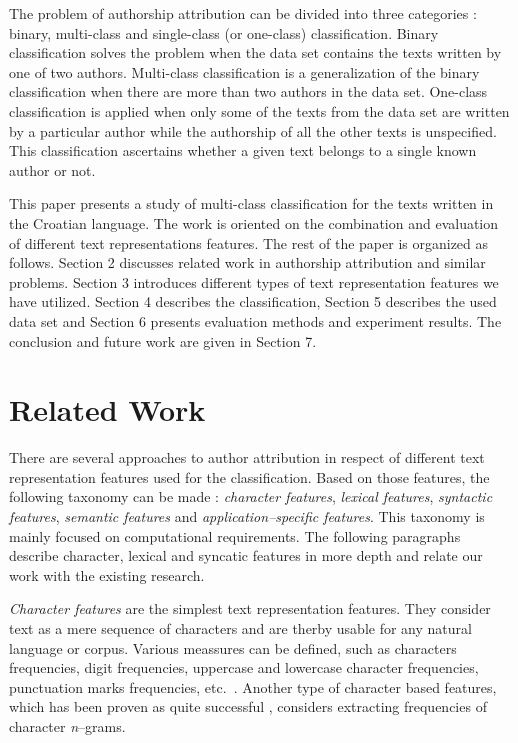 \documentclass{llncs}
\begin{document}
The problem of authorship attribution can be divided into three categories
\cite{zhao2005effective}: binary, multi-class and single-class (or one-class)
classification. Binary classification solves the problem when the data set
contains the texts written by one of two authors. Multi-class classification is a
generalization of the binary classification when there are more than two authors
in the data set. One-class classification is applied when only some of the texts
from the data set are written by a particular author while the authorship of all
the other texts is unspecified. This classification ascertains whether a given
text belongs to a single known author or not.

This paper presents a study of multi-class classification for the texts written
in the Croatian language. The work is oriented on the combination and evaluation
of different text representations features. The rest of the paper is organized as
follows. Section 2 discusses related work in authorship attribution and similar
problems. Section 3 introduces different types of text representation features we
have utilized. Section 4 describes the classification, Section 5 describes the
used data set and Section 6 presents evaluation methods and experiment results.
The conclusion and future work are given in Section 7.

\section{Related Work}
There are several approaches to author attribution in respect of different text
representation features used for the classification. Based on those features, the
following taxonomy can be made \cite{stamatatos2009survey}: \emph{character features},
\emph{lexical features}, \emph{syntactic features}, \emph{semantic features} and
\emph{application--specific features}.  This taxonomy is mainly focused on computational requirements. 
The following paragraphs describe character, lexical and syncatic features 
in more depth and relate our work with the existing research.

\emph{Character features} are the simplest text representation features. They
consider text as a mere sequence of characters and are therby usable for any natural
language or corpus. Various meassures can be defined, such as
characters frequencies, digit frequencies, uppercase and lowercase character
frequencies, punctuation marks frequencies, etc.\ \cite{de2001mining}. Another
type of character based features, which has been proven as quite successful
\cite{peng2003language,stamatatos2006ensemble}, considers extracting
frequencies of character \emph{n}--grams. 
\end{document}
